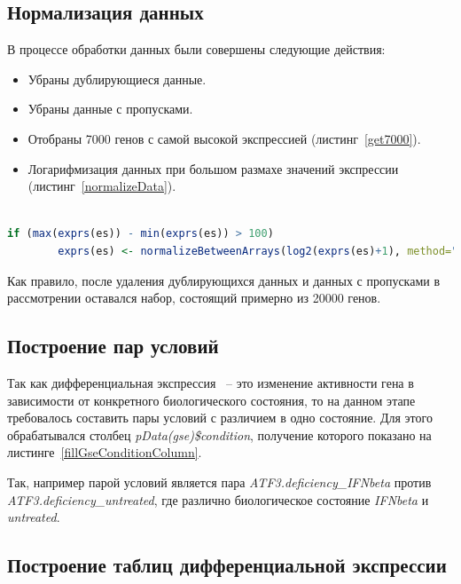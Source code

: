 \documentclass[times,specification,annotation]{itmo-student-thesis}
\begin{document}
\subsection{Нормализация данных}

В процессе обработки данных были совершены следующие действия:
\begin{itemize}
    \item Убраны дублирующиеся данные​.
    \item Убраны данные с пропусками​.
    \item Отобраны 7000 генов с самой высокой экспрессией​ (листинг~\ref{get7000}).
    \item Логарифмизация данных при большом размахе значений экспрессии (листинг~\ref{normalizeData}).
\end{itemize}

\begin{lstlisting}[float=!h, caption={Логарифмизация данных.}, captionpos=b, label={normalizeData}, basicstyle=\footnotesize, language=R]

if (max(exprs(es)) - min(exprs(es)) > 100)
        exprs(es) <- normalizeBetweenArrays(log2(exprs(es)+1), method="quantile")

\end{lstlisting} 

Как правило, после удаления дублирующихся данных и данных с пропусками в рассмотрении оставался набор, состоящий примерно из 20000 генов.

\subsection{Построение пар условий}

Так как дифференциальная экспрессия ~-- это изменение активности гена в зависимости от конкретного биологического состояния, то на данном этапе требовалось составить пары условий с различием в одно состояние. Для этого обрабатывался столбец \textit{pData(gse)\$condition}, получение которого показано на листинге~\ref{fillGseConditionColumn}.

Так, например парой условий является пара \textit{ATF3.deficiency\_IFNbeta} против \textit{ATF3.deficiency\_untreated}, где различно биологическое состояние \textit{IFNbeta} и \textit{untreated}.

\subsection{Построение таблиц дифференциальной экспрессии}
\end{document}
